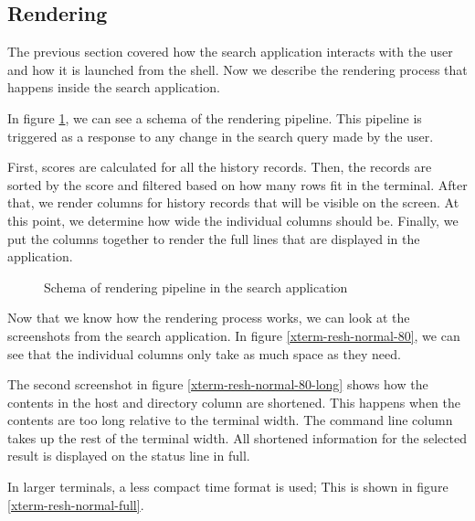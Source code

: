\subsection{Rendering}

The previous section covered how the search application interacts with the user and how it is launched from the shell. Now we describe the rendering process that happens inside the search application.


In figure \ref{impl-search-app-render-pipeline}, we can see a schema of the rendering pipeline. This pipeline is triggered as a response to any change in the search query made by the user. 


First, scores are calculated for all the history records. Then, the records are sorted by the score and filtered based on how many rows fit in the terminal. After that, we render columns for history records that will be visible on the screen. At this point, we determine how wide the individual columns should be. Finally, we put the columns together to render the full lines that are displayed in the application.


\begin{figure}[h!]
\centering
{}
\caption{Schema of rendering pipeline in the search application}
\label{impl-search-app-render-pipeline}
\end{figure}



Now that we know how the rendering process works, we can look at the screenshots from the search application. In figure \ref{xterm-resh-normal-80}, we can see that the individual columns only take as much space as they need. 

The second screenshot in figure \ref{xterm-resh-normal-80-long} shows how the contents in the host and directory column are shortened. This happens when the contents are too long relative to the terminal width. The command line column takes up the rest of the terminal width. All shortened information for the selected result is displayed on the status line in full. 

In larger terminals, a less compact time format is used; This is shown in figure \ref{xterm-resh-normal-full}.


